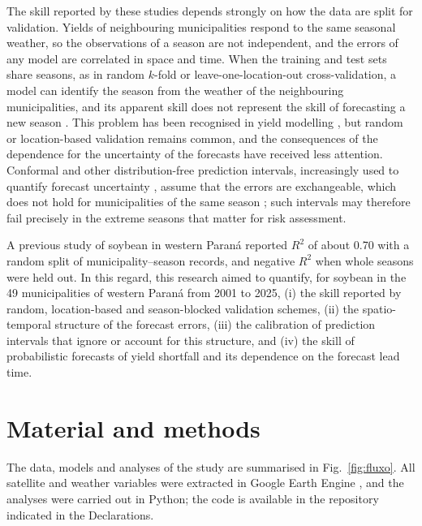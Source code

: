 \documentclass[pdflatex,sn-basic]{sn-jnl}
\begin{document}
The skill reported by these studies depends strongly on how the data are split for validation. Yields of neighbouring municipalities respond to the same seasonal weather, so the observations of a season are not independent, and the errors of any model are correlated in space and time. When the training and test sets share seasons, as in random $k$-fold or leave-one-location-out cross-validation, a model can identify the season from the weather of the neighbouring municipalities, and its apparent skill does not represent the skill of forecasting a new season \citep{roberts2017,meyer2019,ploton2020,wadoux2021}. This problem has been recognised in yield modelling \citep{lischeid2022}, but random or location-based validation remains common, and the consequences of the dependence for the uncertainty of the forecasts have received less attention. Conformal and other distribution-free prediction intervals, increasingly used to quantify forecast uncertainty \citep{lei2018,romano2019}, assume that the errors are exchangeable, which does not hold for municipalities of the same season \citep{barber2023,mao2024}; such intervals may therefore fail precisely in the extreme seasons that matter for risk assessment.

A previous study of soybean in western Paraná \citep{tluszcz2025} reported $R^2$ of about 0.70 with a random split of municipality--season records, and negative $R^2$ when whole seasons were held out. In this regard, this research aimed to quantify, for soybean in the 49 municipalities of western Paraná from 2001 to 2025, (i) the skill reported by random, location-based and season-blocked validation schemes, (ii) the spatio-temporal structure of the forecast errors, (iii) the calibration of prediction intervals that ignore or account for this structure, and (iv) the skill of probabilistic forecasts of yield shortfall and its dependence on the forecast lead time.

\section{Material and methods}\label{sec:mm}

The data, models and analyses of the study are summarised in Fig.~\ref{fig:fluxo}. All satellite and weather variables were extracted in Google Earth Engine \citep{gorelick2017}, and the analyses were carried out in Python; the code is available in the repository indicated in the Declarations.
\end{document}
